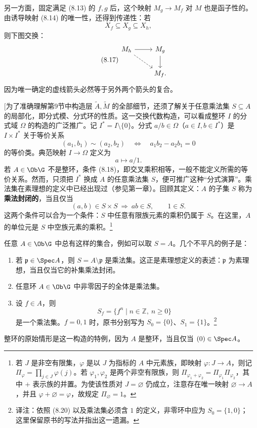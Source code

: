 另一方面，固定满足 (8.13) 的 $f,g$ 后，这个映射 $M_g\to M_f$ 对 $M$ 也是函子性的。由诱导映射 (8.14) 的唯一性，还得到传递性：若
\begin{equation}\tag{8.16}
X_f\subseteq X_g\subseteq X_h,
\end{equation}
则下图交换：
\begin{equation}\tag{8.17}
\begin{tikzcd}[ampersand replacement=\&]
M_h\arrow[r]\arrow[dr,dashed]\&M_g\arrow[d]\\
\&M_f.
\end{tikzcd}
\end{equation}
因为唯一确定的虚线箭头必然等于另外两个箭头的复合。

[为了准确理解第9节中构造层 $\widetilde A,\widetilde M$ 的全部细节，还须了解关于任意乘法集 $S\subseteq A$ 的局部化，即分式模、分式环的性质。这一交换代数构造，可以看成整环 $I$ 的分式域 $\Omega$ 的构造的广泛推广。记 $I^*=I\setminus\{0\}$。分式 $a/b\in\Omega$（$a\in I,b\in I^*$）是 $I\times I^*$ 关于等价关系
\begin{equation}\tag{8.18}
(a_1,b_1)\sim(a_2,b_2)\quad\Longleftrightarrow\quad a_1b_2-a_2b_1=0
\end{equation}
的等价类。典范映射 $I\to\Omega$ 定义为
\begin{equation}\tag{8.19}
a\longmapsto a/1.
\end{equation}
若 $A\in\Ob\G$ 不是整环，条件 (8.18)，即交叉乘积相等，一般不能定义所需的等价关系。然而，只须把 $I^*$ 换成 $A$ 的任意乘法集 $S$，便可推广这种“分式演算”。乘法集在素理想的定义中已经出现过（参见第一章）。回顾其定义：$A$ 的子集 $S$ 称为\textbf{乘法封闭的}，当且仅当
\[
(a,b)\in S\times S\ \Longrightarrow\ ab\in S,\qquad 1\in S.
\]
这两个条件可以合为一个条件：$S$ 中任意有限族元素的乘积仍属于 $S$。在这里，$A$ 的单位元是 $S$ 中空族元素的乘积。\footnote{若 $J$ 是非空有限集，$\varphi$ 是以 $J$ 为指标的 $A$ 中元素族，即映射 $\varphi:J\to A$，则记 $\Pi_\varphi=\prod_{j\in J}\varphi(j)$。若 $\varphi_1,\varphi_2$ 是两个非空有限族，则 $\Pi_{\varphi_1+\varphi_2}=\Pi_{\varphi_1}\Pi_{\varphi_2}$，其中 $+$ 表示族的并置。为使该性质对 $J=\varnothing$ 仍成立，注意存在唯一映射 $\varnothing\to A$，并且 $\varphi+\varnothing=\varphi$，故规定 $\Pi_{\varnothing}=1$。}

任意 $A\in\Ob\G$ 中总有这样的集合，例如可以取 $S=A$。几个不平凡的例子是：
\begin{enumerate}[label=\arabic*)]
\item 若 $\mathfrak p\in\Spec A$，则 $S=A\setminus\mathfrak p$ 是乘法集。这正是素理想定义的表述：$\mathfrak p$ 为素理想，当且仅当它的补集乘法封闭。
\item 任意环 $A\in\Ob\G$ 中非零因子的全体是乘法集。
\item 设 $f\in A$，则
\begin{equation}\tag{8.20}
S_f=\{f^n\mid n\in\mathbb Z,\ n\ge0\}
\end{equation}
是一个乘法集。$f=0,1$ 时，原书分别写为 $S_0=\{0\}$、$S_1=\{1\}$。\footnote{译注：依照 (8.20) 以及乘法集必须含 $1$ 的定义，非零环中应为 $S_0=\{1,0\}$；这里保留原书的写法并指出这一遗漏。}
\end{enumerate}
整环的原始情形是这一构造的特例，因为 $A$ 是整环，当且仅当 $(0)\in\Spec A$。

